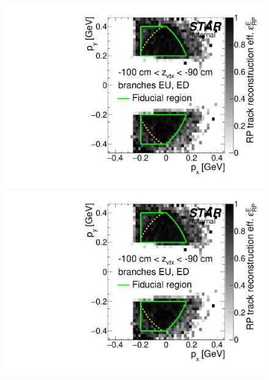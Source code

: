 \begin{figure}[hb]
{}~
\parbox{0.495\textwidth}{
  \centering
  \includegraphics[width=\linewidth,page=4]{graphics/corrections/mcFullEffPxPy.pdf}\\
  \includegraphics[width=\linewidth,page=6]{graphics/corrections/mcFullEffPxPy.pdf}
}%
\end{figure}%
